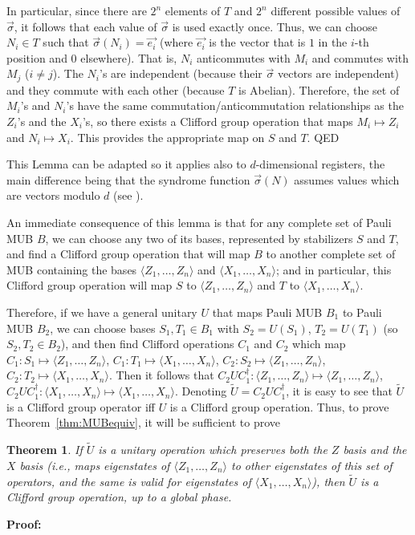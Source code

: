 \documentclass[aps,twocolumn,showpacs,nofootinbib,superscriptaddress]{revtex4}
\newtheorem{theorem}{Theorem}
\newcommand{\Zs}{\langle Z_1, \ldots, Z_n \rangle}
\newcommand{\Xs}{\langle X_1, \ldots, X_n \rangle}
\newcommand{\proof}{{\bf Proof:}}
\newcommand{\QED}{\hfill QED}
\begin{document}
In particular, since there are $2^n$ elements of $T$ and $2^n$
different possible values of $\vec{\sigma}$, it follows that each
value of $\vec{\sigma}$ is used exactly once.  Thus, we can choose
$N_i \in T$ such that $\vec{\sigma}(N_i) = \vec{e_i}$ (where
$\vec{e_i}$ is the vector that is $1$ in the $i$-th position and
$0$ elsewhere).  That is, $N_i$ anticommutes with $M_i$ and
commutes with $M_j$ ($i \neq j$).  The $N_i$'s are independent
(because their $\vec{\sigma}$ vectors are independent) and they
commute with each other (because $T$ is Abelian).  Therefore,
the set of $M_i$'s and $N_i$'s have the same
commutation/anticommutation relationships as the $Z_i$'s and the
$X_i$'s, so there exists a Clifford group operation that maps $M_i
\mapsto Z_i$ and $N_i \mapsto X_i$.  This provides the appropriate
map on $S$ and $T$.  \QED
\medskip

This Lemma can be adapted so it applies also to $d$-dimensional
registers, the main difference being that the syndrome function
$\vec{\sigma}(N)$ assumes values which are vectors modulo $d$ (see
\cite{Gottesman99b}).

An immediate consequence of this lemma is that for any complete
set of Pauli MUB $B$, we can choose any two of its bases,
represented by stabilizers $S$ and $T$, and find a Clifford group
operation that will map $B$ to another complete set of MUB
containing the bases $\Zs$ and $\Xs$; and in particular, this
Clifford group operation will map $S$ to $\Zs$ and $T$ to $\Xs$.

Therefore, if we have a general unitary $U$ that maps Pauli MUB
$B_1$ to Pauli MUB $B_2$, we can choose bases $S_1, T_1 \in B_1$
with $S_2 = U(S_1)$, $T_2 = U(T_1)$ (so $S_2, T_2 \in B_2$), and
then find Clifford operations $C_1$ and $C_2$ which map $C_1: S_1
\mapsto \Zs$, $C_1: T_1 \mapsto \Xs$, $C_2: S_2 \mapsto \Zs$,
$C_2: T_2 \mapsto \Xs$.  Then it follows that $C_2 U C_1^\dagger:
\Zs \mapsto \Zs$, $C_2 U C_1^\dagger: \Xs \mapsto \Xs$. Denoting $\tilde{U}=C_2 U C_1^\dagger$, it is easy to see that $\tilde{U}$ is a Clifford group operator iff $U$ is a Clifford group operation.  Thus, to prove
Theorem~\ref{thm:MUBequiv}, it will be sufficient to prove
\begin{theorem}\label{thm:auxxz}
If $\tilde{U}$ is a unitary operation which preserves both the $Z$ basis
and the $X$ basis (i.e., maps eigenstates of $\Zs$ to other eigenstates
of this set of operators, and the same is valid for eigenstates of $\Xs$), then
$\tilde{U}$ is a Clifford group operation, up to a global phase.
\end{theorem}
\proof
\end{document}
